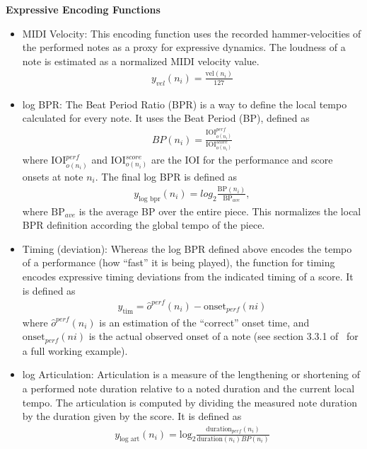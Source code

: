 \textbf{Expressive Encoding Functions}

\newcommand{\iois}{\textrm{IOI}_{o(n_i)}^{score}}
\newcommand{\ioip}{\textrm{IOI}_{o(n_i)}^{perf}}
\begin{itemize}
    \item MIDI Velocity: This encoding function uses the recorded hammer-velocities of the performed notes as a proxy for expressive dynamics. The loudness of a note is estimated as a normalized MIDI velocity value. 
    \begin{align*}
    y_{vel}(n_i) = \frac{\textrm{vel}(n_i)}{127}
    \end{align*}
    \item log BPR: The Beat Period Ratio (BPR) is a way to define the local tempo calculated for every note. It uses the Beat Period (BP), defined as 
        \begin{align*}
        BP(n_i) = \frac{\ioip}{\iois}
        \end{align*}
    where $\ioip$ and $\iois$ are the IOI for the performance and score onsets at note $n_i$. The final log BPR is defined as 
        \begin{align*}
        y_{\textrm{log bpr}}(n_i) = log_2\frac{\textrm{BP}(n_i)}{\textrm{BP}_{ave}},
        \end{align*}
    where $\textrm{BP}_{ave}$ is the average BP over the entire piece. This normalizes the local BPR definition according the global tempo of the piece. 
    \item Timing (deviation): Whereas the log BPR defined above encodes the tempo of a performance (how ``fast'' it is being played), the function for timing encodes expressive timing deviations from the indicated timing of a score. It is defined as 
        \begin{align*}
        y_{\textrm{tim}} = \hat{o}^{perf}(n_i) - \textrm{onset}_{perf}(ni)
        \end{align*}
     where $\hat{o}^{perf}(n_i)$ is an estimation of the ``correct'' onset time, and $\textrm{onset}_{perf}(ni)$ is the actual observed onset of a note (see section 3.3.1 of~\citet{eduardo2018computational} for a full working example). 
    \item log Articulation: Articulation is a measure of the lengthening or shortening of a performed note duration relative to a noted duration and the current local tempo. The articulation is computed by dividing the measured note duration by the duration given by the score. It is defined as 
        \begin{align*}
        y_{\textrm{log art}}(n_i) = \textrm{log}_2\frac{\textrm{duration}_{perf}(n_i)}{\textrm{duration}(n_i)BP(n_i)}
        \end{align*}
    
\end{itemize}

